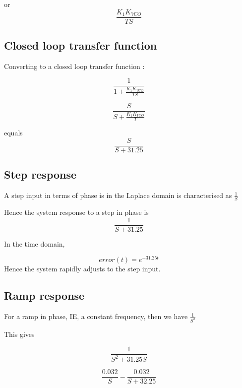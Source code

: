 or 
\begin{equation}
\frac{K_1 K_{VCO}}{T S}
\end{equation}

\subsection{Closed loop transfer function}
Converting to a closed loop transfer function :

\begin{equation}
\frac{1}{1+\frac{K_1 K_{VCO}}{T S}}
\end{equation}


\begin{equation}
\frac{S}{S+\frac{K_1 K_{VCO}}{T}}
\end{equation}

equals 
\begin{equation}
\frac{S}{S+31.25}
\end{equation}

\subsection{Step response}
A step input in terms of phase is in the Laplace domain is characterised as  $\frac{1}{S}$

Hence the system response to a step in phase is
\begin{equation}
\frac{1}{S+31.25}
\end{equation}


In the time domain,

\begin{equation}
 error(t) =  e^{-31.25t}
\end{equation}
Hence the system rapidly adjusts to the step input. 

\subsection{Ramp response}

For a ramp in phase, IE, a constant frequency, then we have $\frac{1}{S^2}$

This gives 

\begin{equation}
\frac{1}{S^2+31.25S}
\end{equation}


\begin{equation}
\frac{0.032}{S} - \frac{0.032}{S+32.25} 
\end{equation}



